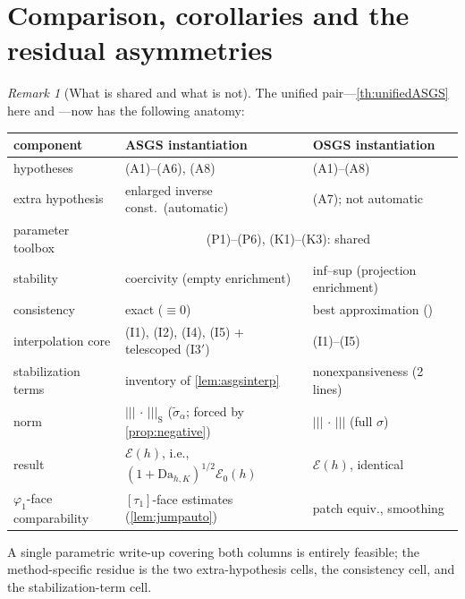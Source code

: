 \documentclass[11pt]{article}
\theoremstyle{remark}
\newtheorem{remark}[theorem]{Remark}
\newcommand{\tnorm}[1]{\lvert\!\lvert\!\lvert\, #1 \,\rvert\!\rvert\!\rvert}
\newcommand{\Dah}{\mathrm{Da}_{h,K}}
\newcommand{\st}{\widetilde{\sigma}_\alpha}
\newcommand{\EF}{\mathcal{E}}
\begin{document}
\section{Comparison, corollaries and the residual asymmetries}
\label{sec:comparison}

\begin{remark}[What is shared and what is not]
\label{rem:shared}
The unified pair---\cref{th:unifiedASGS} here and
\cite[Theorem~6.4]{OSGSnote}---now has the following anatomy:
\begin{center}
\small
\begin{tabular}{lll}
\toprule
component & ASGS instantiation & OSGS instantiation \\
\midrule
hypotheses & (A1)--(A6), (A8) & (A1)--(A8) \\
extra hypothesis & enlarged inverse const.\ (automatic) & (A7); not automatic \\
parameter toolbox & \multicolumn{2}{c}{(P1)--(P6), (K1)--(K3): shared} \\
stability & coercivity (empty enrichment) & inf--sup (projection enrichment) \\
consistency & exact ($\equiv 0$) & best approximation
(\cite[Lemma~6.1]{OSGSnote}) \\
interpolation core & (I1), (I2), (I4), (I5) + telescoped (I3$'$)
& (I1)--(I5) \\
stabilization terms & inventory of \cref{lem:asgsinterp} & nonexpansiveness
(2 lines) \\
norm & $\tnorm{\cdot}_{\mathrm{S}}$ ($\st$; forced by \cref{prop:negative}) &
$\tnorm{\cdot}$ (full $\sigma$) \\
result & $\EF(h)$, i.e., $(1+\Dah)^{1/2}\EF_0(h)$ &
$\EF(h)$, identical \\
$\varphi_1$-face comparability & $[\tau_1]$-face estimates
(\cref{lem:jumpauto}) & patch equiv., smoothing \\
\bottomrule
\end{tabular}
\end{center}
A single parametric write-up covering both columns is entirely feasible; the
method-specific residue is the two extra-hypothesis cells, the consistency cell,
and the stabilization-term cell.
\end{remark}
\end{document}
